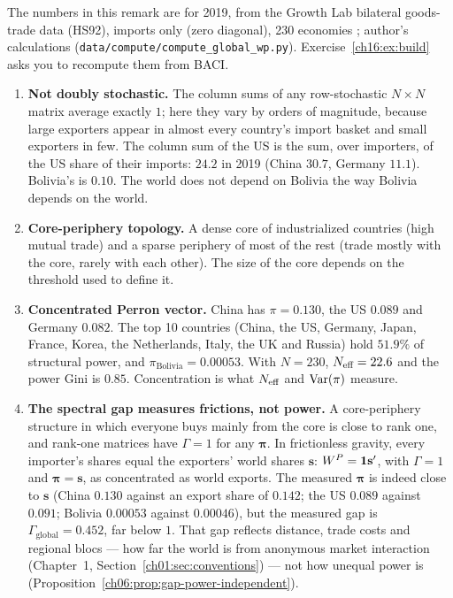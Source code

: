 \documentclass[../structural_economics_book.tex]{subfiles}
\begin{document}
\begin{remark}\label{ch16:prop:global_properties}
The numbers in this remark are for 2019, from the Growth Lab bilateral goods-trade data (HS92), imports only (zero diagonal), 230 economies \citep{growthlab2026atlas}; author's calculations (\texttt{data/compute/compute\_global\_wp.py}). Exercise~\ref{ch16:ex:build} asks you to recompute them from BACI.
\begin{enumerate}
\item \textbf{Not doubly stochastic.} The column sums of any row-stochastic $N \times N$ matrix average exactly $1$; here they vary by orders of magnitude, because large exporters appear in almost every country's import basket and small exporters in few. The column sum of the US is the sum, over importers, of the US share of their imports: $24.2$ in 2019 (China $30.7$, Germany $11.1$). Bolivia's is $0.10$. The world does not depend on Bolivia the way Bolivia depends on the world.
\item \textbf{Core-periphery topology.} A dense core of industrialized countries (high mutual trade) and a sparse periphery of most of the rest (trade mostly with the core, rarely with each other). The size of the core depends on the threshold used to define it.
\item \textbf{Concentrated Perron vector.} China has $\pi = 0.130$, the US $0.089$ and Germany $0.082$. The top 10 countries (China, the US, Germany, Japan, France, Korea, the Netherlands, Italy, the UK and Russia) hold $51.9\%$ of structural power, and $\pi_{\text{Bolivia}} = 0.00053$. With $N = 230$, $N_{\text{eff}} = 22.6$ and the power Gini is $0.85$. Concentration is what $N_{\text{eff}}$ and $\operatorname{Var}(\pi)$ measure.
\item \textbf{The spectral gap measures frictions, not power.} A core-periphery structure in which everyone buys mainly from the core is close to rank one, and rank-one matrices have $\Gamma = 1$ for any $\boldsymbol{\pi}$. In frictionless gravity, every importer's shares equal the exporters' world shares $\mathbf{s}$: $W^P = \mathbf{1}\mathbf{s}'$, with $\Gamma = 1$ and $\boldsymbol{\pi} = \mathbf{s}$, as concentrated as world exports. The measured $\boldsymbol{\pi}$ is indeed close to $\mathbf{s}$ (China $0.130$ against an export share of $0.142$; the US $0.089$ against $0.091$; Bolivia $0.00053$ against $0.00046$), but the measured gap is $\Gamma_{\text{global}} = 0.452$, far below $1$. That gap reflects distance, trade costs and regional blocs --- how far the world is from anonymous market interaction (Chapter~1, Section~\ref{ch01:sec:conventions}) --- not how unequal power is (Proposition~\ref{ch06:prop:gap-power-independent}).
\end{enumerate}
\end{remark}
\end{document}
